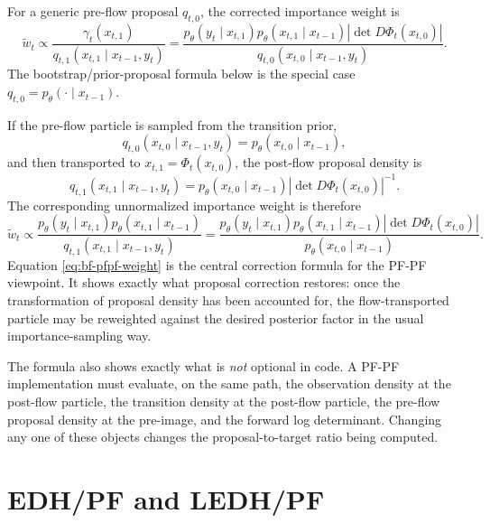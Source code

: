 For a generic pre-flow proposal $q_{t,0}$, the corrected importance weight is
\begin{equation}
\label{eq:bf-pfpf-generic-weight}
  \tilde w_t
  \propto
  \frac{\gamma_t(x_{t,1})}
       {q_{t,1}(x_{t,1}\mid x_{t-1},y_t)}
  =
  \frac{p_\theta(y_t\mid x_{t,1})
        p_\theta(x_{t,1}\mid x_{t-1})
        \left|\det D\Phi_t(x_{t,0})\right|}
       {q_{t,0}(x_{t,0}\mid x_{t-1},y_t)}.
\end{equation}
The bootstrap/prior-proposal formula below is the special case
$q_{t,0}=p_\theta(\cdot\mid x_{t-1})$.

If the pre-flow particle is sampled from the transition prior,
\begin{equation}
\label{eq:bf-pfpf-preflo-prior}
  q_{t,0}(x_{t,0} \mid x_{t-1}, y_t)
  = p_\theta(x_{t,0} \mid x_{t-1}),
\end{equation}
and then transported to $x_{t,1}=\Phi_t(x_{t,0})$, the post-flow proposal
density is
\begin{equation}
\label{eq:bf-pfpf-postflow-prior}
  q_{t,1}(x_{t,1} \mid x_{t-1}, y_t)
  = p_\theta(x_{t,0} \mid x_{t-1})
    \left|\det D\Phi_t(x_{t,0})\right|^{-1}.
\end{equation}
The corresponding unnormalized importance weight is therefore
\begin{equation}
\label{eq:bf-pfpf-weight}
  \tilde w_t
  \propto
  \frac{p_\theta(y_t \mid x_{t,1})
        p_\theta(x_{t,1} \mid x_{t-1})}
       {q_{t,1}(x_{t,1} \mid x_{t-1}, y_t)}
  =
  \frac{p_\theta(y_t \mid x_{t,1})
        p_\theta(x_{t,1} \mid x_{t-1})
        \left|\det D\Phi_t(x_{t,0})\right|}
       {p_\theta(x_{t,0} \mid x_{t-1})}.
\end{equation}
Equation \eqref{eq:bf-pfpf-weight} is the central correction formula for the
PF-PF viewpoint.  It shows exactly what proposal correction restores: once the
transformation of proposal density has been accounted for, the flow-transported
particle may be reweighted against the desired posterior factor in the usual
importance-sampling way.

The formula also shows exactly what is \emph{not} optional in code.  A PF-PF
implementation must evaluate, on the same path, the observation density at the
post-flow particle, the transition density at the post-flow particle, the
pre-flow proposal density at the pre-image, and the forward log determinant.
Changing any one of these objects changes the proposal-to-target ratio being
computed.

\section{EDH/PF and LEDH/PF}
\label{sec:bf-pfpf-edh-ledh}

